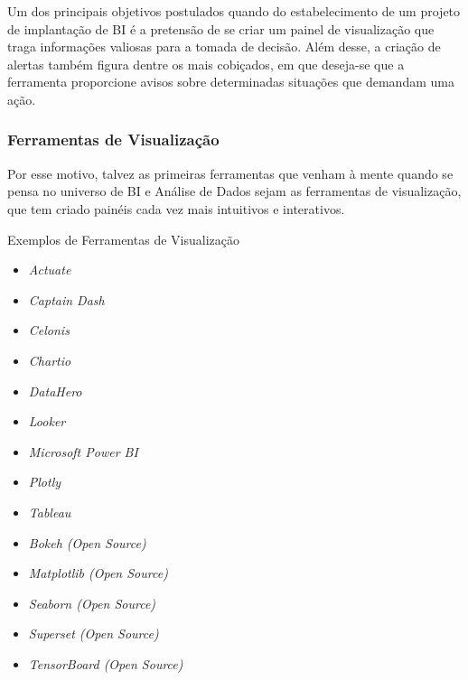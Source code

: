     Um dos principais objetivos postulados quando do estabelecimento de um projeto de implantação de BI é a pretensão de se criar um painel de visualização que traga informações valiosas para a tomada de decisão. Além desse, a criação de alertas também figura dentre os mais cobiçados, em que deseja-se que a ferramenta proporcione avisos sobre determinadas situações que demandam uma ação.

    \subsubsection*{Ferramentas de Visualização}
    
    Por esse motivo, talvez as primeiras ferramentas que venham à mente quando se pensa no universo de BI e Análise de Dados sejam as ferramentas de visualização, que tem criado painéis cada vez mais intuitivos e interativos.

    \begin{env-sistemas}{Exemplos de Ferramentas de Visualização}
         \begin{multicols}{2}
            \begin{itemize}
                \item \emph{Actuate}
                \item \emph{Captain Dash}
                \item \emph{Celonis}
                \item \emph{Chartio}
                \item \emph{DataHero}
                \item \emph{Looker}
                \item \emph{Microsoft Power BI}
                \item \emph{Plotly}
                \item \emph{Tableau}
                \item \emph{Bokeh (Open Source)}
                \item \emph{Matplotlib (Open Source)}
                \item \emph{Seaborn (Open Source)}
                \item \emph{Superset (Open Source)}
                \item \emph{TensorBoard (Open Source)}
            \end{itemize}
        \end{multicols}
    \end{env-sistemas}

